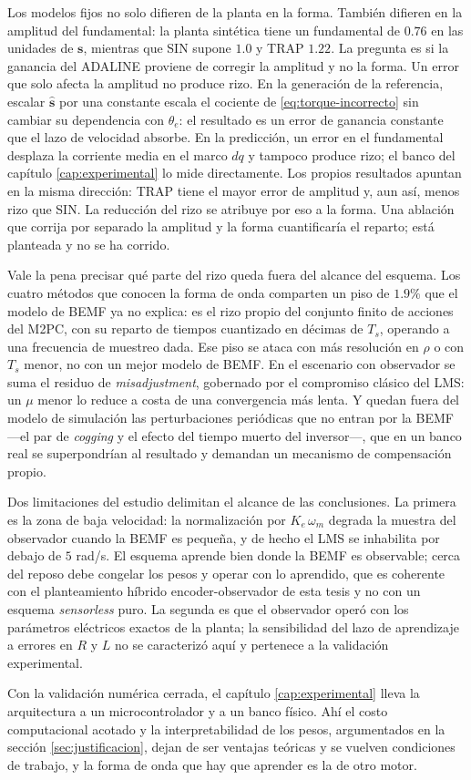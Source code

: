 \documentclass[../../../Tesis_JALS_Maestria.tex]{subfiles}
\begin{document}
Los modelos fijos no solo difieren de la planta en la forma. También difieren en la amplitud del fundamental: la planta sintética tiene un fundamental de $0.76$ en las unidades de $\mathbf{s}$, mientras que SIN supone $1.0$ y TRAP $1.22$. La pregunta es si la ganancia del ADALINE proviene de corregir la amplitud y no la forma. Un error que solo afecta la amplitud no produce rizo. En la generación de la referencia, escalar $\hat{\mathbf{s}}$ por una constante escala el cociente de \eqref{eq:torque-incorrecto} sin cambiar su dependencia con $\theta_e$: el resultado es un error de ganancia constante que el lazo de velocidad absorbe. En la predicción, un error en el fundamental desplaza la corriente media en el marco $dq$ y tampoco produce rizo; el banco del capítulo \ref{cap:experimental} lo mide directamente. Los propios resultados apuntan en la misma dirección: TRAP tiene el mayor error de amplitud y, aun así, menos rizo que SIN. La reducción del rizo se atribuye por eso a la forma. Una ablación que corrija por separado la amplitud y la forma cuantificaría el reparto; está planteada y no se ha corrido.

Vale la pena precisar qué parte del rizo queda fuera del alcance del esquema. Los cuatro métodos que conocen la forma de onda comparten un piso de $1.9\%$ que el modelo de BEMF ya no explica: es el rizo propio del conjunto finito de acciones del M2PC, con su reparto de tiempos cuantizado en décimas de $T_s$, operando a una frecuencia de muestreo dada. Ese piso se ataca con más resolución en $\rho$ o con $T_s$ menor, no con un mejor modelo de BEMF. En el escenario con observador se suma el residuo de \emph{misadjustment}, gobernado por el compromiso clásico del LMS: un $\mu$ menor lo reduce a costa de una convergencia más lenta. Y quedan fuera del modelo de simulación las perturbaciones periódicas que no entran por la BEMF ---el par de \emph{cogging} y el efecto del tiempo muerto del inversor---, que en un banco real se superpondrían al resultado y demandan un mecanismo de compensación propio.

Dos limitaciones del estudio delimitan el alcance de las conclusiones. La primera es la zona de baja velocidad: la normalización por $K_e\,\omega_m$ degrada la muestra del observador cuando la BEMF es pequeña, y de hecho el LMS se inhabilita por debajo de $5$ rad/s. El esquema aprende bien donde la BEMF es observable; cerca del reposo debe congelar los pesos y operar con lo aprendido, que es coherente con el planteamiento híbrido encoder-observador de esta tesis y no con un esquema \emph{sensorless} puro. La segunda es que el observador operó con los parámetros eléctricos exactos de la planta; la sensibilidad del lazo de aprendizaje a errores en $R$ y $L$ no se caracterizó aquí y pertenece a la validación experimental.

Con la validación numérica cerrada, el capítulo \ref{cap:experimental} lleva la arquitectura a un microcontrolador y a un banco físico. Ahí el costo computacional acotado y la interpretabilidad de los pesos, argumentados en la sección \ref{sec:justificacion}, dejan de ser ventajas teóricas y se vuelven condiciones de trabajo, y la forma de onda que hay que aprender es la de otro motor.
\end{document}
